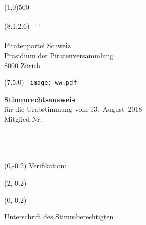 \documentclass[11pt, a4paper]{scrartcl}
\begin{document}
{\begin{minipage}[t][13.42cm][t]{\textwidth}
\end{minipage}

\line(1,0){500}
\vspace{1cm}

\begin{minipage}[t][12.5cm][t]{\textwidth}

\begin{textblock}{9}(8.1,2.6)
\underline{\textsuperscript*{ \givenname~\surname, \street, \postalcode~\location }} \\
\vspace{-0.3cm} \\
Piratenpartei Schweiz \\
Präsidium der Piratenversammlung \\
8000 Zürich
\end{textblock}

\begin{textblock}{6}(7.5,0)
\texttt{[image: ww.pdf]}
\end{textblock}

{\LARGE\textbf{Stimmrechtsausweis}} \\
für die Urabstimmung vom 13.~August~2018 \\

Mitglied Nr. \textbf{\id}   \\
\givenname~\surname         \\
\street                     \\
\postalcode~\location       \\
%

\begin{textblock}{6}(0,-0.2)
Verifikation:
\end{textblock}

\begin{textblock}{4}(2,-0.2)
\raggedright
\code
\end{textblock}

\vspace{4cm}

\begin{textblock}{6}(0,-0.2)
\begin{framed}
Unterschrift des Stimmberechtigten \\
\vspace{1.5cm} ~ \\
\end{framed}
\end{textblock}


\end{minipage}}
\end{document}
